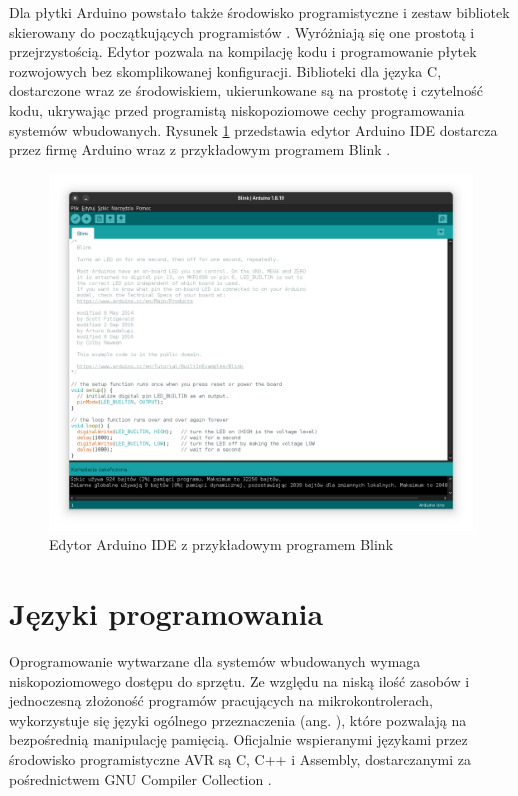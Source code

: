 Dla płytki Arduino powstało także środowisko programistyczne i zestaw bibliotek skierowany do początkujących programistów . Wyróżniają się one prostotą i przejrzystością. Edytor pozwala na kompilację kodu i programowanie płytek rozwojowych bez skomplikowanej konfiguracji. Biblioteki dla języka C, dostarczone wraz ze środowiskiem, ukierunkowane są na prostotę i czytelność kodu, ukrywając przed programistą niskopoziomowe cechy programowania systemów wbudowanych. Rysunek \ref{fig:edytor} przedstawia edytor Arduino IDE dostarcza przez firmę Arduino wraz z przykładowym programem Blink .
\begin{figure}
\centering
	\includegraphics[width=1\textwidth]{graf/arduino-ide-blink.png}
	\caption{Edytor Arduino IDE z przykładowym programem Blink}
\label{fig:edytor}
\end{figure}

\section{Języki programowania}
Oprogramowanie wytwarzane dla systemów wbudowanych wymaga niskopoziomowego dostępu do sprzętu. Ze względu na niską ilość zasobów i jednoczesną złożoność programów pracujących na mikrokontrolerach, wykorzystuje się języki ogólnego przeznaczenia (ang. ), które pozwalają na bezpośrednią manipulację pamięcią. Oficjalnie wspieranymi językami przez środowisko programistyczne AVR są C, C++ i Assembly, dostarczanymi za pośrednictwem GNU Compiler Collection .

